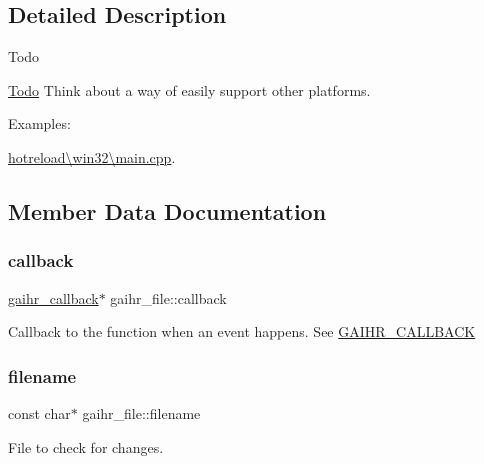 \subsection{Detailed Description}
\begin{DoxyRefDesc}{Todo}
\item[\hyperlink{todo__todo000001}{Todo}]Think about a way of easily support other platforms. \end{DoxyRefDesc}
\begin{Desc}
\item[Examples\+: ]\par
\hyperlink{hotreload_0Cwin32_0Cmain_8cpp-example}{hotreload\textbackslash{}win32\textbackslash{}main.\+cpp}.\end{Desc}


\subsection{Member Data Documentation}
\mbox{\label{structgaihr__file_a9ac45c0142ff1eaf591b870e163d7f31}} 
\subsubsection{\texorpdfstring{callback}{callback}}
{\footnotesize\ttfamily \hyperlink{gai__hotreload_8h_a8026f464cf8636b763b6f03798d40800}{gaihr\+\_\+callback}$\ast$ gaihr\+\_\+file\+::callback}

Callback to the function when an event happens. See \hyperlink{gai__hotreload_8h_a6f8c5bfe220445bbbb8e1c9ef176838a}{G\+A\+I\+H\+R\+\_\+\+C\+A\+L\+L\+B\+A\+CK} \mbox{\label{structgaihr__file_a26ea2bbf62231c3cae2317ca217f8166}} 
\subsubsection{\texorpdfstring{filename}{filename}}
{\footnotesize\ttfamily const char$\ast$ gaihr\+\_\+file\+::filename}

File to check for changes. \mbox{\label{structgaihr__file_ab6eef82d50a8a51d161de3ab7ad98ee9}} 
